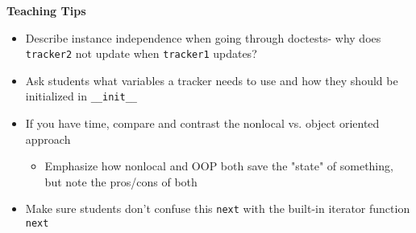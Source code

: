 \begin{blocksection}
\begin{guide}
\textbf{Teaching Tips}
\begin{itemize}
\item Describe instance independence when going through doctests- why does \lstinline{tracker2} not update when \lstinline{tracker1} updates?
\item Ask students what variables a tracker needs to use and how they should be initialized in \lstinline{__init__}
\item If you have time, compare and contrast the nonlocal vs. object oriented approach
\begin{itemize}
  \item Emphasize how nonlocal and OOP both save the "state" of something, but note the pros/cons of both
\end{itemize}
\item Make sure students don't confuse this \lstinline{next} with the built-in iterator function \lstinline{next}
\end{itemize}
\end{guide}
\end{blocksection}
